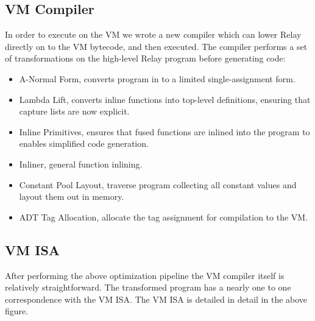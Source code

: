 \subsection{VM Compiler}


In order to execute on the VM we wrote a new compiler which
  can lower Relay directly on to the VM bytecode, and then
  executed.
The compiler performs a set of transformations on the high-level
  Relay program before generating code:
\begin{itemize}
  \item A-Normal Form, converts program in to a limited single-assignment form.
  \item Lambda Lift, converts inline functions into top-level definitions,
        ensuring that capture lists are now explicit.
  \item Inline Primitives, ensures that fused functions are inlined into
        the program to enables simplified code generation.
  \item Inliner, general function inlining.
  \item Constant Pool Layout, traverse program collecting all constant values
        and layout them out in memory.
  \item ADT Tag Allocation, allocate the tag assignment for compilation
        to the VM.
\end{itemize}

\subsection{VM ISA}



After performing the above optimization pipeline the VM compiler
  itself is relatively straightforward.
The transformed program has a nearly one to one correspondence
  with the VM ISA.
The VM ISA is detailed in detail in the above figure.

